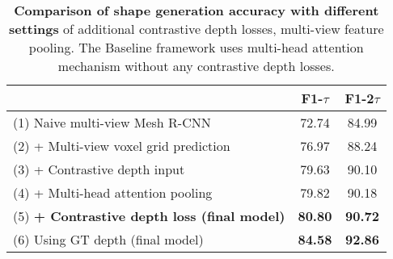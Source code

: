 
\begin{table}[ht]
\begin{center}
\footnotesize
\begin{tabular}{ l c c }
\toprule[1pt]
 &F1-$\tau$ &F1-2$\tau$   \\ \hline
(1) Naive multi-view Mesh R-CNN \qquad \qquad  \qquad  \qquad  \qquad & 72.74 & 84.99 \\
(2) + Multi-view voxel grid prediction & 76.97 & 88.24 \\
(3) + Contrastive depth input             & 79.63 & 90.10 \\
(4) + Multi-head attention pooling   & 79.82    & 90.18  \\
(5) \bf{+ Contrastive depth loss (final model)}  & \textbf{80.80} & \textbf{90.72}\\
(6) Using GT depth (final model)                 & \textbf{84.58} & \textbf{92.86} \\
\bottomrule[1pt]
\end{tabular}
\end{center}
\vspace{-4mm}
\caption{
    \textbf{Comparison of shape generation accuracy with different settings} of additional contrastive depth losses, multi-view feature pooling.
    The Baseline framework uses multi-head attention mechanism without any contrastive depth losses.}
\label{table:ablation_study}
\end{table}

